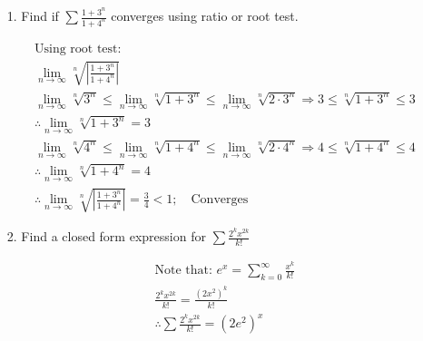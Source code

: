    \begin{itemize}
        \item [1.] Find if $\sum \frac{1+3^{n}}{1+4^{n}}$ converges using ratio or root test.
        \\
        \begin{mdframed}
            \begin{equation*}
                \begin{gathered}
                    \text{Using root test:}                         \\
                    \lim_{n \to \infty}\sqrt[n]
                    {\left|\frac{1+3^{n}}{1+4^{n}}\right|}          \\
                    \lim_{n \to \infty}\sqrt[n]{3^{n}} \leq 
                    \lim_{n \to \infty}\sqrt[n]{1 + 3^{n}} \leq 
                    \lim_{n \to \infty}\sqrt[n]{2\cdot3^{n}}
                    \Rightarrow 3 \leq \sqrt[n]{1 + 3^{n}} \leq 3   \\
                    \therefore \lim_{n \to \infty} \sqrt[n]{1 + 3^{n}} = 3  \\
                    \lim_{n \to \infty}\sqrt[n]{4^{n}} \leq 
                    \lim_{n \to \infty}\sqrt[n]{1 + 4^{n}} \leq 
                    \lim_{n \to \infty}\sqrt[n]{2\cdot4^{n}}
                    \Rightarrow 4 \leq \sqrt[n]{1 + 4^{n}} \leq 4   \\
                    \therefore \lim_{n \to \infty} \sqrt[n]{1 + 4^{n}} = 4  \\
                    \therefore \lim_{n \to \infty}\sqrt[n]
                    {\left|\frac{1+3^{n}}{1+4^{n}}\right|} 
                    = \frac{3}{4} < 1; \quad \boxed{\text{Converges}}
                \end{gathered}
            \end{equation*}
        \end{mdframed}
            

        \item [2.] Find a closed form expression for $\sum \frac{2^{k}x^{2k}}{k!}$
        \\
        \begin{mdframed}
            \begin{equation*}
                \begin{gathered}
                    \text{Note that: } e^{x} = 
                    \sum_{k=0}^{\infty} \frac{x^{k}}{k!}\\
                    \frac{2^{k}x^{2k}}{k!} =
                    \frac{(2x^{2})^{k}}{k!}             \\
                    \therefore \sum \frac{2^{k}x^{2k}}{k!} = \boxed{(2e^{2})^{x}}
                \end{gathered}
            \end{equation*}
        \end{mdframed}


\end{itemize}
